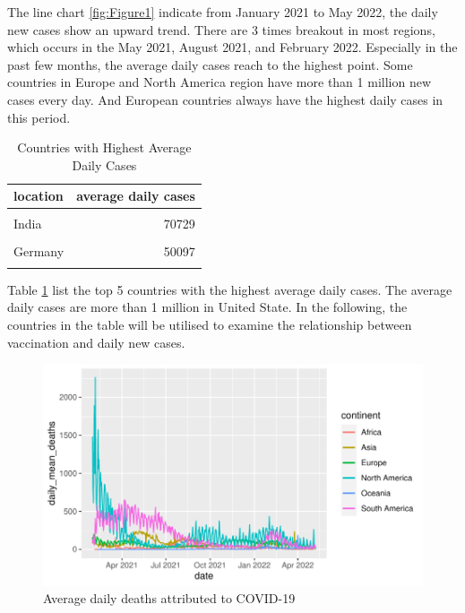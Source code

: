 \documentclass[11pt,a4paper,]{article}
\begin{document}
The line chart \ref{fig:Figure1} indicate from January 2021 to May 2022, the daily new cases show an upward trend. There are 3 times breakout in most regions, which occurs in the May 2021, August 2021, and February 2022. Especially in the past few months, the average daily cases reach to the highest point. Some countries in Europe and North America region have more than 1 million new cases every day. And European countries always have the highest daily cases in this period.

\begin{table}[!h]

\caption{\label{tab:Table1}Countries with Highest Average Daily Cases}
\centering
\begin{tabular}[t]{l|r}
\hline
location & average daily cases\\
\hline
\cellcolor{gray!6}{United States} & \cellcolor{gray!6}{120485}\\
\hline
India & 70729\\
\hline
\cellcolor{gray!6}{France} & \cellcolor{gray!6}{56649}\\
\hline
Germany & 50097\\
\hline
\cellcolor{gray!6}{Brazil} & \cellcolor{gray!6}{46861}\\
\hline
\end{tabular}
\end{table}

Table \ref{tab:Table1} list the top 5 countries with the highest average daily cases. The average daily cases are more than 1 million in United State.
In the following, the countries in the table will be utilised to examine the relationship between vaccination and daily new cases.

\begin{figure}

{\centering \includegraphics{report_files/figure-latex/Figure2-1} 

}

\caption{Average daily deaths attributed to COVID-19}\label{fig:Figure2}
\end{figure}
\end{document}
